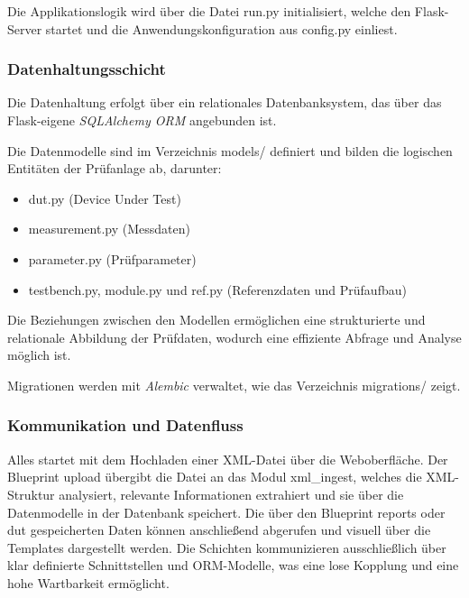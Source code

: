 Die Applikationslogik wird über die Datei run.py initialisiert, welche den Flask-Server startet und die Anwendungskonfiguration aus config.py einliest.


\subsubsection*{Datenhaltungsschicht}

Die Datenhaltung erfolgt über ein relationales Datenbanksystem, das über das Flask-eigene \textit{SQLAlchemy ORM} angebunden ist.

Die Datenmodelle sind im Verzeichnis models/ definiert und bilden die logischen Entitäten der Prüfanlage ab, darunter:

\begin{itemize}

\item
dut.py (Device Under Test)

\item
measurement.py (Messdaten)

\item
parameter.py (Prüfparameter)

\item
testbench.py, module.py und ref.py (Referenzdaten und Prüfaufbau)

\end{itemize}

Die Beziehungen zwischen den Modellen ermöglichen eine strukturierte und relationale Abbildung der Prüfdaten, wodurch eine effiziente Abfrage und Analyse möglich ist.

Migrationen werden mit \textit{Alembic} verwaltet, wie das Verzeichnis migrations/ zeigt.



\subsubsection{Kommunikation und Datenfluss}

Alles startet mit dem Hochladen einer XML-Datei über die Weboberfläche.
Der Blueprint upload übergibt die Datei an das Modul xml\_ingest, welches die XML-Struktur analysiert, relevante Informationen extrahiert und sie über die Datenmodelle in der Datenbank speichert.
 Die über den Blueprint reports oder dut gespeicherten Daten können anschließend abgerufen und visuell über die Templates dargestellt werden.
 Die Schichten kommunizieren ausschließlich über klar definierte Schnittstellen und ORM-Modelle, was eine lose Kopplung und eine hohe Wartbarkeit ermöglicht.








